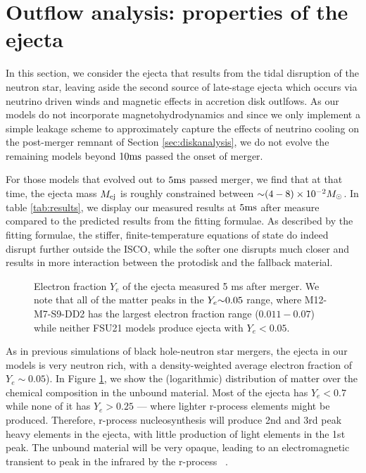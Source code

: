 \section{Outflow analysis: properties of the ejecta}
\label{sec:tail-analysis}

In this section, we consider the ejecta that results from the tidal disruption of the neutron star, leaving aside the second source of late-stage ejecta which occurs via neutrino driven winds and magnetic effects in accretion disk outlfows.  As our models do not incorporate magnetohydrodynamics and since we only implement a simple leakage scheme to approximately capture the effects of neutrino cooling on the post-merger remnant of Section \ref{sec:diskanalysis}, we do not evolve the remaining models beyond $10 {\rm ms}$ passed the onset of merger.

For those models that evolved out to $5 {\rm ms}$ passed merger, we find that at that time, the ejecta mass $M_{\rm ej}$ is roughly constrained between $\mathord{\sim} (4 - 8) \times 10^{-2} M_\odot$.
In table \ref{tab:results}, we display our measured results at $5 {\rm ms}$ after measure compared to the predicted results from the fitting formulae.  
As described by the fitting formulae, the stiffer, finite-temperature equations of state do indeed disrupt further outside the ISCO, while the softer one disrupts much closer and results in more interaction between the protodisk and the fallback material.


\begin{figure}
	\centering
	
	\caption[Composition of the ejecta]{
		Electron fraction $Y_e$ of the ejecta measured 5 ms after merger.  We note that all of the matter peaks in the $Y_e \mathord{\sim} 0.05$ range, where M12-M7-S9-DD2 has the largest electron fraction range ($0.011 - 0.07$) while neither FSU21 models produce ejecta with $Y_e < 0.05$.
	}
	\label{fig:Yehisto}
\end{figure}

As in previous simulations of black hole-neutron star mergers, the ejecta in our models is very neutron rich, with a density-weighted average electron fraction of $Y_e \sim 0.05$).  
In Figure \ref{fig:Yehisto}, we show the (logarithmic) distribution of matter over the chemical composition in the unbound material.  
Most of the ejecta has $Y_e < 0.7$ while none of it has $Y_e > 0.25$ --- where lighter r-process elements might be produced.
Therefore, r-process nucleosynthesis will produce 2nd and 3rd peak heavy elements in the ejecta, with little production of light elements in the 1st peak.  
The unbound material will be very opaque, leading to an electromagnetic transient to peak in the infrared by the r-process ~\cite{2013ApJ...775...18B}.

